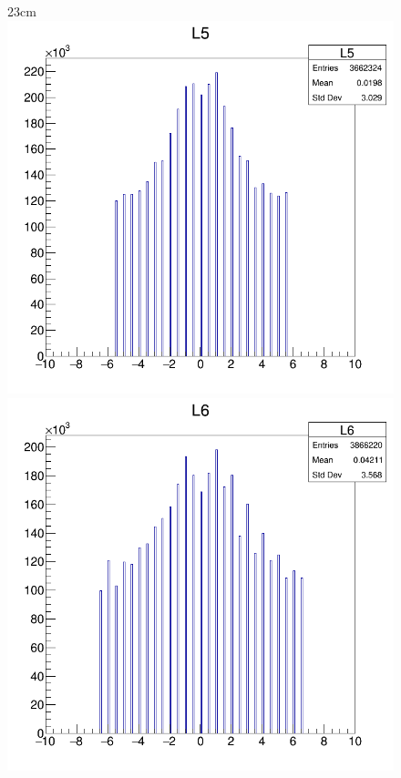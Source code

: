 \begin{landscape}
\begin{figure}[htbp]{23cm}
		\includegraphics[scale=0.26]{AppendixCMSL1TT/figs/JetPt250_PU200_deltaS_l5}
		\includegraphics[scale=0.26]{AppendixCMSL1TT/figs/JetPt250_PU200_deltaS_l6}				
		\label{fig:deltaS_jet250_pu200}
	\end{figure}
\end{landscape}

